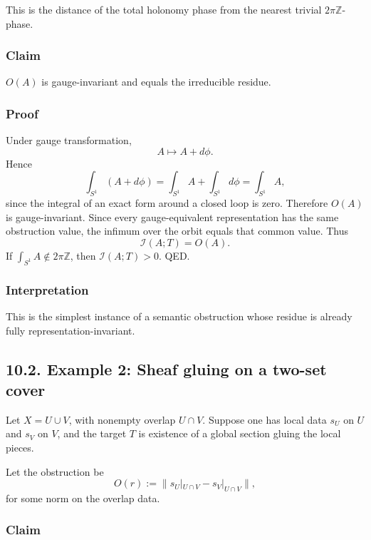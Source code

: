 \documentclass[
]{article}
\begin{document}
This is the distance of the total holonomy phase from the nearest
trivial \(2\pi \mathbb{Z}\)-phase.

\subsubsection{Claim}\label{claim}

\(O(A)\) is gauge-invariant and equals the irreducible residue.

\subsubsection{Proof}\label{proof-7}

Under gauge transformation, \[
A \mapsto A + d\phi.
\] Hence \[
\int_{S^1} (A + d\phi) = \int_{S^1} A + \int_{S^1} d\phi = \int_{S^1} A,
\] since the integral of an exact form around a closed loop is zero.
Therefore \(O(A)\) is gauge-invariant. Since every gauge-equivalent
representation has the same obstruction value, the infimum over the
orbit equals that common value. Thus \[
\mathcal{I}(A;T) = O(A).
\] If \(\int_{S^1} A \notin 2\pi \mathbb{Z}\), then
\(\mathcal{I}(A;T) > 0\). QED.

\subsubsection{Interpretation}\label{interpretation-3}

This is the simplest instance of a semantic obstruction whose residue is
already fully representation-invariant.

\subsection{10.2. Example 2: Sheaf gluing on a two-set
cover}\label{example-2-sheaf-gluing-on-a-two-set-cover}

Let \(X = U \cup V\), with nonempty overlap \(U \cap V\). Suppose one
has local data \(s_U\) on \(U\) and \(s_V\) on \(V\), and the target
\(T\) is existence of a global section gluing the local pieces.

Let the obstruction be \[
O(r) := \| s_U|_{U \cap V} - s_V|_{U \cap V} \|,
\] for some norm on the overlap data.

\subsubsection{Claim}\label{claim-1}
\end{document}
